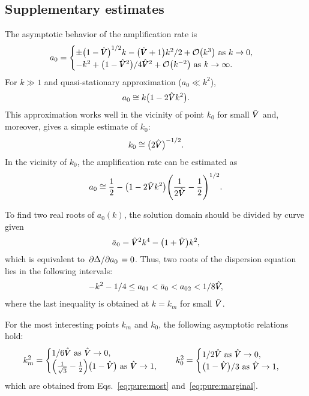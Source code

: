 \documentclass{article}
\newcommand{\hV}[1][\qty(\bar{V})]{\vphantom{#1}\mathrlap{\smash{\hat{V}}}V}
\begin{document}
\subsection{Supplementary estimates}

The asymptotic behavior of the amplification rate is
\begin{equation}\label{eq:pure:a0_asymptotics}
    a_0 = \begin{cases}
        \pm\qty(1-\hV)^{1/2}k - \qty(\hV+1)k^2/2 + \order{k^3} \text{ as } k\to0,\\
        -k^2 + \qty(1-\hV^2)/4\hV^2 + \order{k^{-2}} \text{ as } k\to\infty.
    \end{cases}
\end{equation}
For $k\gg1$ and quasi-stationary approximation ($a_0\ll k^2$),
\begin{equation}\label{eq:pure:a0_approx}
    a_0 \cong k\qty(1-2\hV k^2).
\end{equation}
This approximation works well in the vicinity of point $k_0$ for small $\hV$
and, moreover, gives a simple estimate of $k_0$:
\begin{equation}\label{eq:pure:k0}
    k_0 \cong \qty(2\hV)^{-1/2}.
\end{equation}
In the vicinity of $k_0$, the amplification rate can be estimated as
\begin{equation}\label{eq:pure:a0_near_k0}
    a_0 \cong \frac12 - \qty(1-2\hV k^2)\qty(\frac1{2\hV} - \frac12)^{1/2}.
\end{equation}

To find two real roots of $a_0(k)$, the solution domain should be divided by curve given
\begin{equation}\label{eq:pure:bar_a0}
    \bar{a}_0 = \hV^2k^4 - \qty(1+\hV)k^2,
\end{equation}
which is equivalent to $\pdv*{\Delta}{a_0}=0$.
Thus, two roots of the dispersion equation lies in the following intervals:
\begin{equation}\label{eq:pure:a0_intervals}
    -k^2 - 1/4 \leq a_{01} < \bar{a}_0 < a_{02} < 1/8\hV,
\end{equation}
where the last inequality is obtained at $k=k_m$ for small $\hV$.

For the most interesting points $k_m$ and $k_0$, the following asymptotic relations hold:
\begin{equation}\label{eq:pure:k_asymptotics}
    k_m^2 = \begin{cases}
        1/6\hV \text{ as } \hV\to0,\\
        \qty(\frac1{\sqrt3} - \frac12)\qty(1-\hV) \text{ as } \hV\to1,
    \end{cases} \quad k_0^2 = \begin{cases}
        1/2\hV \text{ as } \hV\to0,\\
        \qty(1-\hV)/3 \text{ as } \hV\to1,
    \end{cases}
\end{equation}
which are obtained from Eqs.~\eqref{eq:pure:most} and~\eqref{eq:pure:marginal}.
\end{document}
